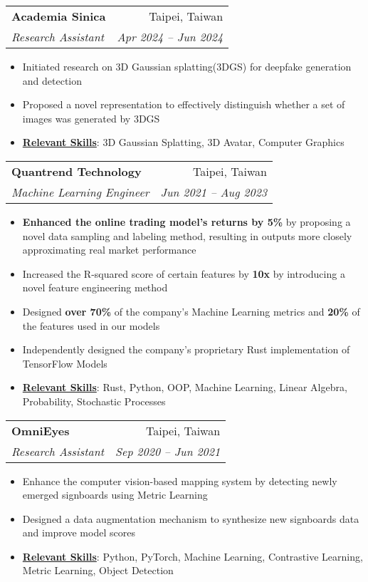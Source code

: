 \documentclass[letterpaper,11pt]{article}
\makeatletter
\newcommand{\resumeItem}[1]{
\item\small{
    {#1 \vspace{-2pt}}
  }
}
\newcommand{\resumeSubheading}[4]{
  \vspace{-2pt}
\item
  \begin{tabular*}{0.97\textwidth}[t]{l@{\extracolsep{\fill}}r}
    \textbf{#1} & #2 \\
    \textit{\small#3} & \textit{\small #4} \\
  \end{tabular*}\vspace{-7pt}
}
\newcommand{\resumeSubSubheading}[2]{
\item
  \begin{tabular*}{0.97\textwidth}{l@{\extracolsep{\fill}}r}
    \textit{\small#1} & \textit{\small #2} \\
  \end{tabular*}\vspace{-7pt}
}
\newcommand{\resumeSubHeadingListEnd}{
  \end{itemize}}
\newcommand{\resumeItemListStart}{
\begin{itemize}}
\newcommand{\resumeItemListEnd}{
  \end{itemize}\vspace{-5pt}}
\makeatother
\begin{document}
\resumeSubheading
{Academia Sinica}{Taipei, Taiwan}
{Research Assistant}{Apr 2024 -- Jun 2024}
\resumeItemListStart
\resumeItem{Initiated research on 3D Gaussian splatting(3DGS) for
deepfake generation and detection}
\resumeItem{Proposed a novel representation to effectively
distinguish whether a set of images was generated by 3DGS}
\resumeItem{\textbf{\underline{Relevant Skills}}:
  3D Gaussian Splatting, 3D Avatar, Computer Graphics
}
\resumeItemListEnd


\resumeSubheading
{Quantrend Technology}{Taipei, Taiwan}
{Machine Learning Engineer}{Jun 2021 -- Aug 2023}
\resumeItemListStart
\resumeItem{\textbf{Enhanced the online trading model's returns by
  5\%} by proposing a novel data sampling and labeling method, resulting
in outputs more closely approximating real market performance}
\resumeItem{Increased the R-squared score of certain features by
\textbf{10x} by introducing a novel feature engineering method}
\resumeItem{Designed \textbf{over 70\%} of the company's Machine
Learning metrics and \textbf{20\%} of the features used in our models}
\resumeItem{Independently designed the company's proprietary Rust
implementation of TensorFlow Models}
\resumeItem{\textbf{\underline{Relevant Skills}}:
  Rust, Python, OOP, Machine Learning, Linear Algebra, Probability,
  Stochastic Processes
}
\resumeItemListEnd

\resumeSubheading
{OmniEyes}{Taipei, Taiwan}
{Research Assistant}{Sep 2020 -- Jun 2021}
\resumeItemListStart
\resumeItem{Enhance the computer vision-based mapping system by
detecting newly emerged signboards using Metric Learning}
\resumeItem{Designed a data augmentation mechanism to synthesize new
signboards data and improve model scores}
\resumeItem{\textbf{\underline{Relevant Skills}}:
  Python, PyTorch, Machine Learning, Contrastive Learning, Metric
  Learning, Object Detection
}
\resumeItemListEnd
\end{document}

